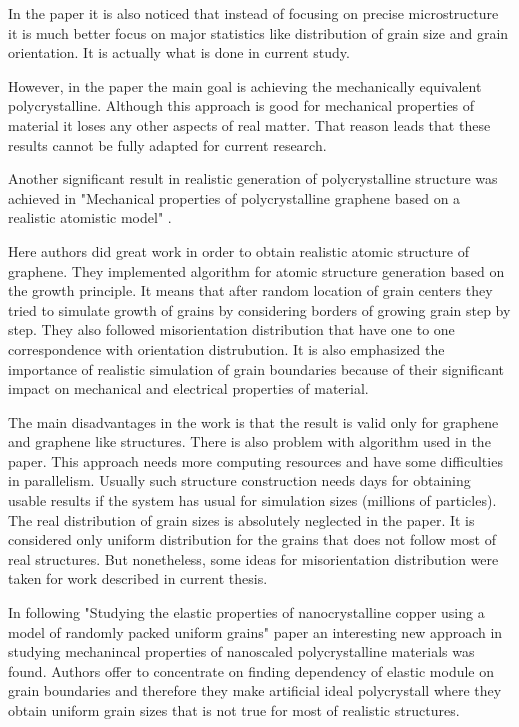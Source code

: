 \documentclass[12pt]{report}
\begin{document}
In the paper it is also noticed that instead of focusing on precise microstructure it is much better focus on major statistics like  distribution of grain size and grain orientation. It is actually what is done in current study.

However, in the paper the main goal is achieving the mechanically equivalent polycrystalline. Although this approach is good for mechanical properties of material it loses any other aspects of real matter. That reason leads that these results cannot be fully adapted for current research.

Another significant result in realistic generation of polycrystalline structure was achieved in "Mechanical properties of polycrystalline graphene based on a realistic atomistic model" \cite{kotak12}.

Here authors did great work in order to obtain realistic atomic structure of graphene. They implemented algorithm for atomic structure generation based on the growth principle. It means that after random location of grain centers they tried to simulate growth of grains by considering borders of growing grain step by step. They also followed misorientation distribution that have one to one correspondence with orientation distrubution. It is also emphasized the importance of realistic simulation of grain boundaries because of their significant impact on mechanical and electrical properties of material.

The main disadvantages in the work is that the result is valid only for graphene and graphene like structures. There is also problem with algorithm used in the paper. This approach needs more computing resources and have some difficulties in parallelism. Usually such structure construction needs days for obtaining usable results if the system has usual for simulation sizes (millions of particles). The real distribution of grain sizes is absolutely neglected in the paper. It is considered only uniform distribution for the grains that does not follow most of real structures. But nonetheless, some ideas for misorientation distribution were taken for work described in current thesis.

In following "Studying the elastic properties of nanocrystalline copper using a model of randomly packed uniform grains" \cite{guo13} paper an interesting new approach in studying mechanincal properties of nanoscaled polycrystalline materials was found. Authors offer to concentrate on finding dependency of elastic module on grain boundaries and therefore they make artificial ideal polycrystall where they obtain uniform grain sizes that is not true for most of realistic structures.
\end{document}
